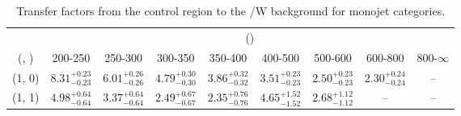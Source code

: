 \begin{table}[h!]
\tiny
\centering
\caption{Transfer factors from the \mmj control region to the \ttbar/W background for monojet categories.\label{tab:tf_mumu_ttw_mono}}
\begin{tabular}
{ccccccccc}
	\hline\hline
	& \multicolumn{8}{c}{\scalht (\gev)} \\ 
	 (\njet,  \nb) & 200-250 & 250-300 & 300-350 & 350-400 & 400-500 & 500-600 & 600-800 & 800-$\infty$ \\ [0.8ex] 
\hline
	(1, 0) & $8.31^{+ 0.23 }_{- 0.23 }$ & $6.01^{+ 0.26 }_{- 0.26 }$ & $4.79^{+ 0.30 }_{- 0.30 }$ & $3.86^{+ 0.32 }_{- 0.32 }$ & $3.51^{+ 0.23 }_{- 0.23 }$ & $2.50^{+ 0.23 }_{- 0.23 }$ & $2.30^{+ 0.24 }_{- 0.24 }$ & -- \\[0.5ex] 
	(1, 1) & $4.98^{+ 0.64 }_{- 0.64 }$ & $3.37^{+ 0.64 }_{- 0.64 }$ & $2.49^{+ 0.67 }_{- 0.67 }$ & $2.35^{+ 0.76 }_{- 0.76 }$ & $4.65^{+ 1.52 }_{- 1.52 }$ & $2.68^{+ 1.12 }_{- 1.12 }$ & -- & -- \\[0.5ex] 
	\hline
	\hline
\end{tabular}
\end{table}
